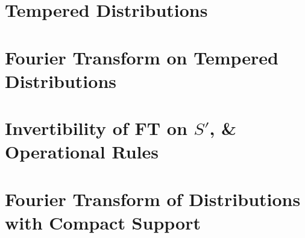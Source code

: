 \documentclass[12pt, a4]{article}
\begin{document}
\section{Tempered Distributions}

\section{Fourier Transform on Tempered Distributions}

\section{Invertibility of FT on $S'$, \& Operational Rules}


\section{Fourier Transform of Distributions with Compact Support}
\end{document}
